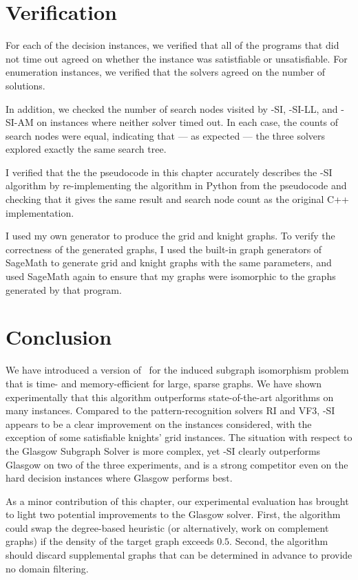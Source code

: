 \section{Verification}

For each of the decision instances, we verified that all of the programs that did not time out
agreed on whether the instance was satistfiable or unsatisfiable.  For enumeration instances,
we verified that the solvers agreed on the number of solutions.

In addition, we checked the number of search nodes visited by \McSplit-SI,
\McSplit-SI-LL, and \McSplit-SI-AM
on instances where neither solver timed out.  In each case, the counts of search nodes were equal,
indicating that --- as expected --- the three solvers explored exactly the same search tree.

I verified that the the pseudocode in this chapter accurately describes the \McSplit-SI
algorithm by re-implementing the algorithm in Python from the pseudocode and checking
that it gives the same result and search node count as the original C++ implementation.

I used my own generator to produce the grid and knight graphs.  To verify the
correctness of the generated graphs, I used the built-in graph generators of
SageMath \citep{sagemath} to generate grid and knight graphs with the same
parameters, and used SageMath again to ensure that my graphs were isomorphic to
the graphs generated by that program.

\section{Conclusion}

We have introduced a version of \McSplit\ for the induced subgraph isomorphism problem that is time- and memory-efficient for large, sparse graphs.
We have shown experimentally that this algorithm outperforms state-of-the-art algorithms on many instances.
Compared to the pattern-recognition solvers RI and VF3, \McSplit-SI appears to be a clear improvement
on the instances considered, with the exception of some satisfiable knights' grid instances.  The situation
with respect to the Glasgow Subgraph Solver is more complex, yet \McSplit-SI clearly outperforms Glasgow on
two of the three experiments, and is a strong competitor even on the hard decision instances
where Glasgow performs best.

As a minor contribution of this chapter, our experimental evaluation has
brought to light two potential improvements to the Glasgow solver.  First, the
algorithm could swap the degree-based heuristic (or alternatively, work on
complement graphs) if the density of the target graph exceeds $0.5$.  Second,
the algorithm should discard supplemental graphs that can be determined in
advance to provide no domain filtering.

